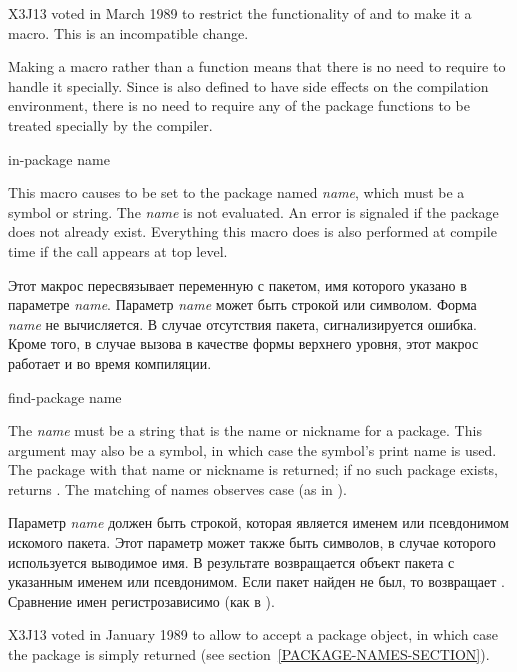 \begin{newer}
X3J13 voted in March 1989 
to restrict the functionality of  and to make it a macro.
This is an incompatible change.

    Making  a macro rather than a function means that there
    is no need to require  to handle it specially.  Since
     is also defined to have side
    effects on the compilation environment,
    there is no need to require any of the package functions to be treated
    specially by the compiler.

\begin{defmac}
in-package name

This macro causes  to be set to the package named \emph{name},
    which must be a symbol or string.  The \emph{name} is not evaluated.
    An error is signaled if the
    package does not already exist.  Everything this macro does is also
    performed at compile time if the call appears at top level.

Этот макрос пересвязывает переменную  с пакетом, имя которого
указано в параметре \emph{name}. Параметр \emph{name} может быть строкой или
символом. Форма \emph{name} не вычисляется.
В случае отсутствия пакета, сигнализируется ошибка.
Кроме того, в случае вызова в качестве формы верхнего уровня, этот макрос
работает и во время компиляции.
\end{defmac}
\end{newer}


\begin{defun}[Function]
find-package name

The \emph{name} must be a string that is the name or nickname for a
package.  This argument may also be a symbol, in which case the symbol's
print name is used.  The package with that name or nickname
is returned; if no such package exists,  returns {\false}.
The matching of names observes case (as in ).

Параметр \emph{name} должен быть строкой, которая является именем или
псевдонимом искомого пакета. Этот параметр может также быть символов, в случае
которого используется выводимое имя. В результате возвращается объект пакета с
указанным именем или псевдонимом. Если пакет найден не был, то
 возвращает {\false}.
Сравнение имен регистрозависимо (как в ).

\begin{new}
X3J13 voted in January 1989
to allow  to accept a package object, in which case
the package is simply returned (see section~\ref{PACKAGE-NAMES-SECTION}).
\end{new}
\end{defun}

